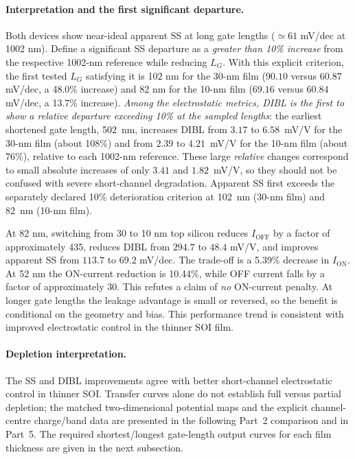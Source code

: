 \paragraph{Interpretation and the first significant departure.}
Both devices show near-ideal apparent SS at long gate lengths
($\simeq61$ mV/dec at 1002 nm). Define a significant SS departure
as a \emph{greater than 10\% increase} from the respective
1002-nm reference while reducing $L_G$. With this explicit criterion,
the first tested $L_G$ satisfying it is 102 nm for the 30-nm
film ($90.10$ versus $60.87$ mV/dec, a 48.0\% increase) and
82 nm for the 10-nm film ($69.16$ versus $60.84$ mV/dec, a
13.7\% increase). \emph{Among the electrostatic metrics, DIBL is the first to show a
relative departure exceeding 10\% at the sampled lengths}: the earliest
shortened gate length, 502~nm, increases DIBL from $3.17$ to
$6.58$~mV/V for the 30-nm film (about 108\%) and from
$2.39$ to $4.21$~mV/V for the 10-nm film (about 76\%),
relative to each 1002-nm reference. These large \emph{relative}
changes correspond to small absolute increases of only
$3.41$ and $1.82$~mV/V, so they should not be confused
with severe short-channel degradation. Apparent SS first
exceeds the separately declared 10\% deterioration criterion
at 102~nm (30-nm film) and 82~nm (10-nm film).

At 82 nm, switching from 30 to 10 nm top silicon reduces
$I_{\mathrm{OFF}}$ by a factor of approximately 435,
reduces DIBL from $294.7$ to $48.4$ mV/V,
and improves apparent SS from $113.7$ to $69.2$ mV/dec.
The trade-off is a 5.39\% decrease in $I_{\mathrm{ON}}$.
At 52 nm the ON-current reduction is 10.44\%, while OFF
current falls by a factor of approximately 30. This refutes
a claim of \emph{no} ON-current penalty. At longer
gate lengths the leakage advantage is small or reversed,
so the benefit is conditional on the geometry and bias.
This performance trend is consistent with improved
electrostatic control in the thinner SOI film.

\paragraph{Depletion interpretation.}
The SS and DIBL improvements agree with better short-channel
electrostatic control in thinner SOI. Transfer curves alone do not
establish full versus partial depletion; the matched two-dimensional
potential maps and the explicit channel-centre charge/band data
are presented in the following Part~2 comparison and in Part~5.
The required shortest/longest gate-length output curves for each
film thickness are given in the next subsection.
